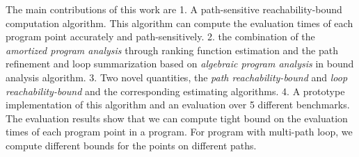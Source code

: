 The main contributions of this work are
1. A path-sensitive reachability-bound computation algorithm.
This algorithm can compute the evaluation times of each program point accurately and path-sensitively.
2. the combination of the \emph{amortized program analysis} through ranking function estimation and the path refinement and loop summarization based on \emph{algebraic program analysis} in bound analysis algorithm.
3. Two novel quantities, the \emph{path reachability-bound} and \emph{loop reachability-bound} and the corresponding estimating algorithms.
4. A prototype implementation of this algorithm and an evaluation over 5 different benchmarks.
  The evaluation results show that we can compute tight bound on the evaluation times of each program point in a program. For program with multi-path loop, we compute different bounds for the points on different paths.
